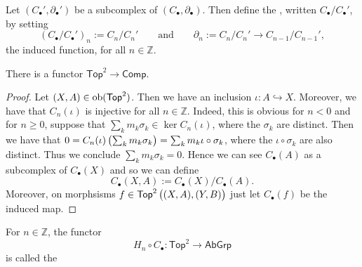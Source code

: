 \begin{definition}
	Let $(C_\bullet',\partial_\bullet')$ be a subcomplex of $(C_\bullet,\partial_\bullet)$. Then define the , written $C_\bullet/C_\bullet'$, by setting
	\begin{equation*}
		(C_\bullet/C_\bullet')_n := C_n/C_n' \qquad \text{and} \qquad \partial_n := C_n/C_n' \to C_{n - 1}/C_{n - 1}',
	\end{equation*}
	\noindent the induced function, for all $n \in \mathbb{Z}$.
\end{definition}

\begin{proposition}
	There is a functor $\mathsf{Top}^2 \to \mathsf{Comp}$.
\end{proposition}

\begin{proof}
	Let $(X,A) \in \operatorname{ob}(\mathsf{Top}^2)$. Then we have an inclusion $\iota : A \hookrightarrow X$. Moreover, we have that $C_n(\iota)$ is injective for all $n \in \mathbb{Z}$. Indeed, this is obvious for $n < 0$ and for $n \geq 0$, suppose that $\sum_k m_k \sigma_k \in \ker C_n(\iota)$, where the $\sigma_k$ are distinct. Then we have that $0 = C_n(\iota)\del[1]{\sum_k m_k \sigma_k} = \sum_k m_k \iota \circ \sigma_k$, where the $\iota \circ \sigma_k$ are also distinct. Thus we conclude $\sum_k m_k \sigma_k = 0$. Hence we can see $C_\bullet(A)$ as a subcomplex of $C_\bullet(X)$ and so we can define
	\begin{equation*}
		C_\bullet(X,A) := C_\bullet(X)/C_\bullet(A).
	\end{equation*}
	Moreover, on morphsisms $f \in \mathsf{Top}^2\del[1]{(X,A),(Y,B)}$ just let $C_\bullet(f)$ be the induced map.
\end{proof}

\begin{definition}
	For $n \in \mathbb{Z}$, the functor 
	\begin{equation}
		H_n \circ C_\bullet : \mathsf{Top}^2 \to \mathsf{AbGrp}
	\end{equation}
	\noindent is called the 
\end{definition}

